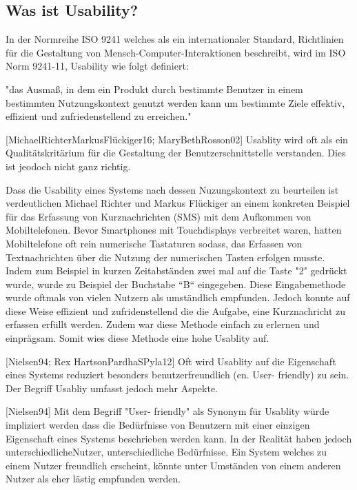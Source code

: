 \subsection{Was ist Usability?}

In der Normreihe ISO 9241 welches als ein internationaler Standard,  Richtlinien für die Gestaltung von Mensch-Computer-Interaktionen beschreibt, wird im ISO Norm 9241-11,  Usability wie folgt definiert:

"das Ausmaß, in dem ein Produkt durch bestimmte Benutzer in einem bestimmten Nutzungskontext genutzt werden kann um bestimmte Ziele effektiv, effizient und zufriedenstellend zu erreichen."

[MichaelRichterMarkusFlückiger16; MaryBethRosson02] Usablity wird  oft als ein Qualitätskritärium für die Gestaltung der Benutzerschnittstelle verstanden. Dies ist jeodoch nicht ganz richtig.

Dass die Usability eines Systems nach dessen Nuzungskontext zu beurteilen ist verdeutlichen Michael Richter und Markus Flückiger an einem konkreten Beispiel für das Erfassung 
von Kurznachrichten (SMS) mit dem Aufkommen von Mobiltelefonen.  Bevor Smartphones mit Touchdisplays verbreitet waren, hatten Mobiltelefone oft rein 
numerische Tastaturen sodass, das Erfassen von Textnachrichten über die Nutzung der numerischen Tasten erfolgen musste. Indem zum Beispiel in kurzen Zeitabständen zwei mal
auf die Taste "2" gedrückt wurde, wurde zu Beispiel der Buchstabe ``B`` eingegeben. Diese Eingabemethode wurde oftmals von vielen Nutzern als umständlich empfunden. 
Jedoch konnte auf diese Weise effizient und zufridenstellend die die Aufgabe, eine Kurznachricht zu erfassen erfüllt werden. Zudem war diese Methode einfach zu erlernen und einprägsam.
 Somit wies diese Methode eine hohe Usablity auf. 

[Nielsen94; Rex HartsonPardhaSPyla12] Oft wird Usablity auf die Eigenschaft eines Systems reduziert besonders benutzerfreundlich (en. User- friendly) zu sein. Der Begriff Usabliy umfasst jedoch mehr Aspekte. 

[Nielsen94] Mit dem Begriff "User- friendly" als Synonym für Usablity würde impliziert werden dass die Bedürfnisse von Benutzern mit einer einzigen Eigenschaft 
eines Systems beschrieben werden kann. In der Realität haben jedoch unterschiedlicheNutzer, unterschiedliche Bedürfnisse. Ein System welches zu einem Nutzer freundlich erscheint, könnte unter 
Umständen von einem anderen Nutzer als eher lästig empfunden werden.

